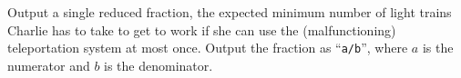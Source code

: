 
	Output a single reduced fraction, the expected minimum number of light trains Charlie has to take to get to work if she can use the (malfunctioning) teleportation system at most once.
	Output the fraction as ``\texttt{a/b}'', where $a$ is the numerator and $b$ is the denominator.
